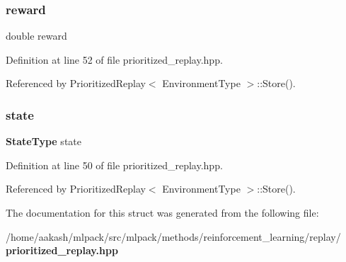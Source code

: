 \subsubsection{reward}
{\footnotesize\ttfamily double reward}



Definition at line 52 of file prioritized\+\_\+replay.\+hpp.



Referenced by Prioritized\+Replay$<$ Environment\+Type $>$\+::\+Store().

\mbox{\label{structmlpack_1_1rl_1_1PrioritizedReplay_1_1Transition_a4d1aa26dcfa648e02cbb0964cddbdbfe}} 
\subsubsection{state}
{\footnotesize\ttfamily \textbf{ State\+Type} state}



Definition at line 50 of file prioritized\+\_\+replay.\+hpp.



Referenced by Prioritized\+Replay$<$ Environment\+Type $>$\+::\+Store().



The documentation for this struct was generated from the following file\+:\begin{DoxyCompactItemize}
\item 
/home/aakash/mlpack/src/mlpack/methods/reinforcement\+\_\+learning/replay/\textbf{ prioritized\+\_\+replay.\+hpp}\end{DoxyCompactItemize}
